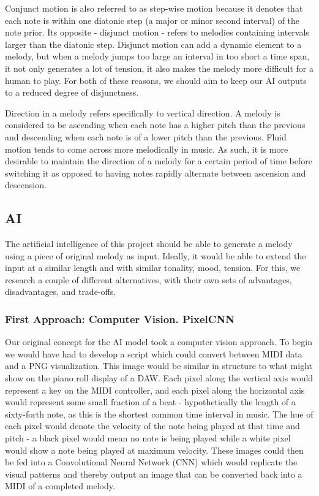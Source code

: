 Conjunct motion is also referred to as step-wise motion because it denotes that each note is within
one diatonic step (a major or minor second interval) of the note prior. Its opposite - disjunct
motion - refers to melodies containing intervals larger than the diatonic step. Disjunct motion can
add a dynamic element to a melody, but when a melody jumps too large an interval in too short a
time span, it not only generates a lot of tension, it also makes the melody more difficult for a
human to play. For both of these reasons, we should aim to keep our AI outputs to a reduced degree
of disjunctness.\autocite{contour}

Direction in a melody refers specifically to vertical direction. A melody is considered to be
ascending when each note has a higher pitch than the previous and descending when each note is of a
lower pitch than the previous. Fluid motion tends to come across more melodically in music. As
such, it is more desirable to maintain the direction of a melody for a certain period of time
before switching it as opposed to having notes rapidly alternate between ascension and descension.\autocite{contour}

\subsection{AI}

The artificial intelligence of this project should be able to generate a melody using
a piece of original melody as input. Ideally, it would be able to extend the input at a
similar length and with similar tonality, mood, tension. For this, we research
a couple of different alternatives, with their own sets of advantages, disadvantages, and
trade-offs.

\subsubsection{First Approach: Computer Vision. PixelCNN}

Our original concept for the AI model took a computer vision approach. To begin we would
have had to develop a script which could convert between MIDI data and a PNG
visualization. This image would be similar in structure to what might show on the piano
roll display of a DAW. Each pixel along the vertical axis would represent a key on the
MIDI controller, and each pixel along the horizontal axis would represent some small
fraction of a beat - hypothetically the length of a sixty-forth note, as this is the
shortest common time interval in music. The hue of each pixel would denote the velocity
of the note being played at that time and pitch - a black pixel would mean no note is
being played while a white pixel would show a note being played at maximum velocity.
These images could then be fed into a Convolutional Neural Network (CNN) which would
replicate the visual patterns and thereby output an image that can be converted back into
a MIDI of a completed melody.


